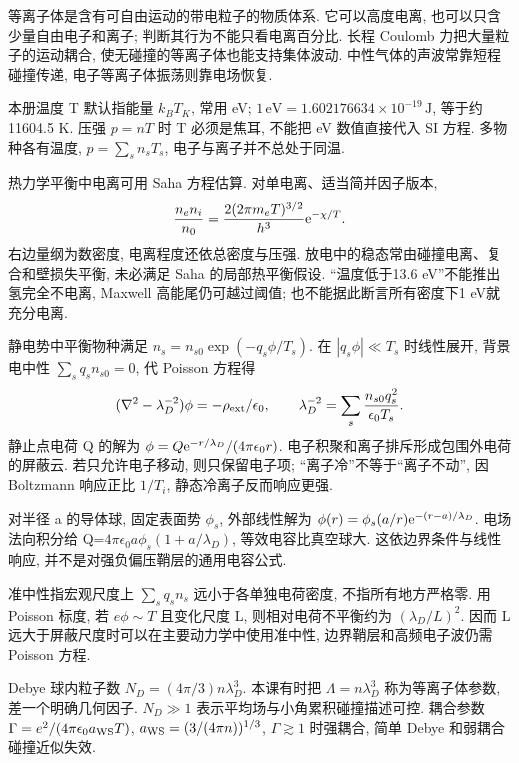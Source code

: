 \label{ch:plasma-basic}
等离子体是含有可自由运动的带电粒子的物质体系. 它可以高度电离, 也可以只含少量自由电子和离子; 判断其行为不能只看电离百分比. 长程 Coulomb 力把大量粒子的运动耦合, 使无碰撞的等离子体也能支持集体波动. 中性气体的声波常靠短程碰撞传递, 电子等离子体振荡则靠电场恢复.

本册温度 T 默认指能量 $k_BT_K$, 常用 eV; $1\,\mathrm{eV}=1.602176634\times10^{-19}\,\mathrm J$, 等于约11604.5 K. 压强 $p=nT$ 时 T 必须是焦耳, 不能把 eV 数值直接代入 SI 方程. 多物种各有温度, $p=\sum_sn_sT_s$, 电子与离子并不总处于同温.

热力学平衡中电离可用 Saha 方程估算. 对单电离、适当简并因子版本,
\begin{equation}
 \frac{n_en_i}{n_0}=\frac{2(2\pi m_eT)^{3/2}}{h^3}\mathrm e^{-\chi/T}.
\end{equation}
右边量纲为数密度, 电离程度还依总密度与压强. 放电中的稳态常由碰撞电离、复合和壁损失平衡, 未必满足 Saha 的局部热平衡假设. ``温度低于13.6 eV''不能推出氢完全不电离, Maxwell 高能尾仍可越过阈值; 也不能据此断言所有密度下1 eV就充分电离.

静电势中平衡物种满足 $n_s=n_{s0}\exp(-q_s\phi/T_s)$. 在 $|q_s\phi|\ll T_s$ 时线性展开, 背景电中性 $\sum_sq_sn_{s0}=0$, 代 Poisson 方程得
\begin{equation}\label{eq:debye}
 (\nabla^2-\lambda_D^{-2})\phi=-\rho_{\rm ext}/\epsilon_0,
 \qquad\lambda_D^{-2}=\sum_s\frac{n_{s0}q_s^2}{\epsilon_0T_s}.
\end{equation}
静止点电荷 Q 的解为 $\phi=Q\mathrm e^{-r/\lambda_D}/(4\pi\epsilon_0r)$. 电子积聚和离子排斥形成包围外电荷的屏蔽云. 若只允许电子移动, 则只保留电子项; ``离子冷''不等于``离子不动'', 因 Boltzmann 响应正比 $1/T_i$, 静态冷离子反而响应更强.

对半径 a 的导体球, 固定表面势 $\phi_s$, 外部线性解为 $\phi(r)=\phi_s(a/r)\mathrm e^{-(r-a)/\lambda_D}$. 电场法向积分给 Q=$4\pi\epsilon_0a\phi_s(1+a/\lambda_D)$, 等效电容比真空球大. 这依边界条件与线性响应, 并不是对强负偏压鞘层的通用电容公式.

准中性指宏观尺度上 $\sum_sq_sn_s$ 远小于各单独电荷密度, 不指所有地方严格零. 用 Poisson 标度, 若 $e\phi\sim T$ 且变化尺度 L, 则相对电荷不平衡约为 $(\lambda_D/L)^2$. 因而 L远大于屏蔽尺度时可以在主要动力学中使用准中性, 边界鞘层和高频电子波仍需 Poisson 方程.

Debye 球内粒子数 $N_D=(4\pi/3)n\lambda_D^3$. 本课有时把 $\Lambda=n\lambda_D^3$ 称为等离子体参数, 差一个明确几何因子. $N_D\gg1$ 表示平均场与小角累积碰撞描述可控. 耦合参数 $\Gamma=e^2/(4\pi\epsilon_0a_{
\rm WS}T)$, $a_{\rm WS}=(3/(4\pi n))^{1/3}$, $\Gamma\gtrsim1$ 时强耦合, 简单 Debye 和弱耦合碰撞近似失效.

